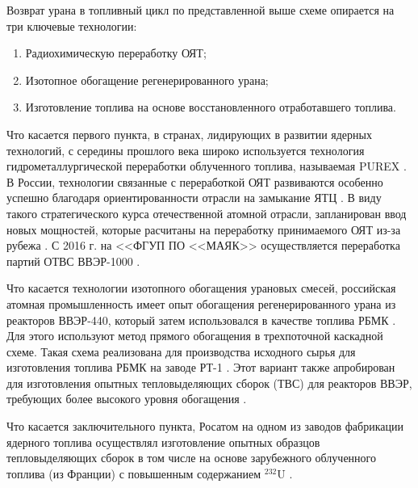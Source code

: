 Возврат урана в топливный цикл по представленной выше схеме опирается на три ключевые технологии:
\begin{enumerate}
  \item Радиохимическую переработку ОЯТ;
  \item Изотопное обогащение регенерированного урана;
  \item Изготовление топлива на основе восстановленного отработавшего топлива.
\end{enumerate}

Что касается первого пункта, в странах, лидирующих в развитии ядерных технологий, с середины прошлого века широко используется технология гидрометаллургической переработки облученного топлива, называемая PUREX \cite{selvaduraySurveyNuclearFuel1979}. В России, технологии связанные с переработкой ОЯТ развиваются особенно успешно благодаря ориентированности отрасли на замыкание ЯТЦ \cite{balihinSostoyaniiPerspektivahRazvitiya2018, efimenkoProblemyPerspektivyRazvitiya2017}. В виду такого стратегического курса отечественной атомной отрасли, запланирован ввод новых мощностей, которые расчитаны на переработку принимаемого ОЯТ из-за рубежа \cite{050519L3942005}. С 2016 г. на <<ФГУП ПО <<МАЯК>> осуществляется переработка партий ОТВС ВВЭР-1000 \cite{PyatyyNacionalnyyDoklad}.

Что касается технологии изотопного обогащения урановых смесей, российская атомная промышленность имеет опыт обогащения регенерированного урана из реакторов ВВЭР-440, который затем использовался в качестве топлива РБМК \cite{VVER10001200Za}. Для этого используют метод прямого обогащения в трехпоточной каскадной схеме. Такая схема реализована для производства исходного сырья для изготовления топлива РБМК на заводе РТ-1 \cite{volkVozvratUranaIz2010}. Этот вариант также апробирован для изготовления опытных тепловыделяющих сборок (ТВС) для реакторов ВВЭР, требующих более высокого уровня обогащения \cite{proselkovAnalizVozmozhnostiIspolzovaniya2003}.

Что касается заключительного пункта, Росатом на одном из заводов фабрикации ядерного топлива осуществлял изготовление опытных образцов тепловыделяющих сборок в том числе на основе зарубежного облученного топлива (из Франции) с повышенным содержанием $^{232}$U \cite{kislovRadiacionnyeAspektyIspolzovaniya}.

